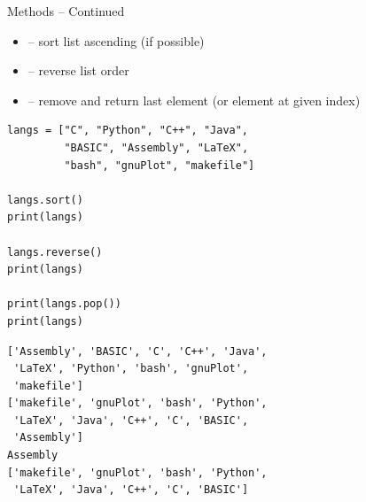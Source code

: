 \begin{frame}[fragile]
%
\begin{Large}
Methods -- Continued
\vspace{6pt}
\end{Large}
\begin{itemize}
\item {} -- sort list ascending (if possible)
\item {} -- reverse list order
\item {} -- remove and return last element (or element at given index)
\end{itemize}
%
\begin{tcbraster}[raster columns=2,
                  raster equal height,
                  nobeforeafter,
                  raster column skip=0.5cm]
\begin{codebox}
\begin{verbatim}
langs = ["C", "Python", "C++", "Java",
         "BASIC", "Assembly", "LaTeX",
         "bash", "gnuPlot", "makefile"]

langs.sort()
print(langs)

langs.reverse()
print(langs)

print(langs.pop())
print(langs)
\end{verbatim}
\end{codebox}
%
\begin{cmdbox}
\begin{verbatim}
['Assembly', 'BASIC', 'C', 'C++', 'Java', 
 'LaTeX', 'Python', 'bash', 'gnuPlot', 
 'makefile']
['makefile', 'gnuPlot', 'bash', 'Python',
 'LaTeX', 'Java', 'C++', 'C', 'BASIC',
 'Assembly']
Assembly
['makefile', 'gnuPlot', 'bash', 'Python',
 'LaTeX', 'Java', 'C++', 'C', 'BASIC']

\end{verbatim}
\end{cmdbox}
\end{tcbraster}
%
\end{frame}